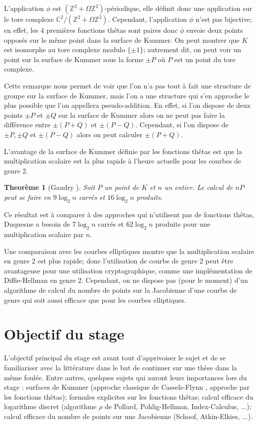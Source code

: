 \documentclass[a4paper]{article}
\newtheorem{theoreme}{Theorème}[section]
\theoremstyle{definition}
\theoremstyle{remark}
\numberwithin{equation}{section}
\begin{document}
L'application $\phi$ est $(\mathbb{Z}^2 + \Omega\mathbb{Z}^2)$-périodique, elle définit donc une application sur le tore complexe $\mathbb{C}^2/(\mathbb{Z}^2+\Omega\mathbb{Z}^2)$. Cependant, l'application $\phi$ n'est pas bijective; en effet, les 4 premières fonctions thêtas sont paires donc $\phi$ envoie deux points opposés sur le même point dans la surface de Kummer. On peut montrer que $K$ est isomorphe au tore complexe modulo $\{\pm 1\}$; autrement dit, on peut voir un point sur la surface de Kummer sous la forme $\pm P$ où $P$ est un point du tore complexe.

Cette remarque nous permet de voir que l'on n'a pas tout à fait une structure de groupe sur la surface de Kummer, mais l'on a une structure qui s'en approche le plus possible que l'on appellera pseudo-addition. En effet, si l'on dispose de deux points $\pm P$ et $\pm Q$ sur la surface de Kummer alors on ne peut pas faire la différence entre $\pm(P+Q)$ et $\pm(P-Q)$. Cependant, si l'on dispose de $\pm P,\pm Q$ et $\pm(P-Q)$ alors on peut calculer $\pm(P+Q)$.

L'avantage de la surface de Kummer définie par les fonctions thêtas est que la multiplication scalaire est la plus rapide à l'heure actuelle pour les courbes de genre 2.
\begin{theoreme}[Gaudry \cite{gaudry}]
Soit $P$ un point de $K$ et $n$ un entier. Le calcul de $nP$ peut se faire en $9\log_2 n$ carrés et $16\log_2 n$ produits.
\end{theoreme}

Ce résultat est à comparer à des approches qui n'utilisent pas de fonctions thêtas, Duquesne \cite{duquesne} a besoin de $7\log_2 n$ carrés et $62\log_2 n$ produits pour une multiplication scalaire par $n$.

Une comparaison avec les courbes elliptiques montre que la multiplication scalaire en genre 2 est plus rapide; donc l'utilisation de courbe de genre 2 peut être avantageuse pour une utilisation cryptographique, comme une implémentation de Diffie-Hellman en genre 2. Cependant, on ne dispose pas (pour le moment) d'un algorithme de calcul du nombre de points sur la Jacobienne d'une courbe de genre qui soit aussi efficace que pour les courbes elliptiques.

\section{Objectif du stage}
L'objectif principal du stage est avant tout d'apprivoiser le sujet et de se familiariser avec la littérature dans le but de continuer sur une thèse dans la même foulée. Entre autres, quelques sujets qui auront leurs importances lors du stage : surfaces de Kummer (approche classique de Cassels-Flynn \cite{cassels-flynn}, approche par les fonctions thêtas); formules explicites sur les fonctions thêtas; calcul efficace du logarithme discret (algorithme $\rho$ de Pollard, Pohlig-Hellman, Index-Calculus, ...); calcul efficace du nombre de points sur une Jacobienne (Schoof, Atkin-Elkies, ...).
\end{document}
